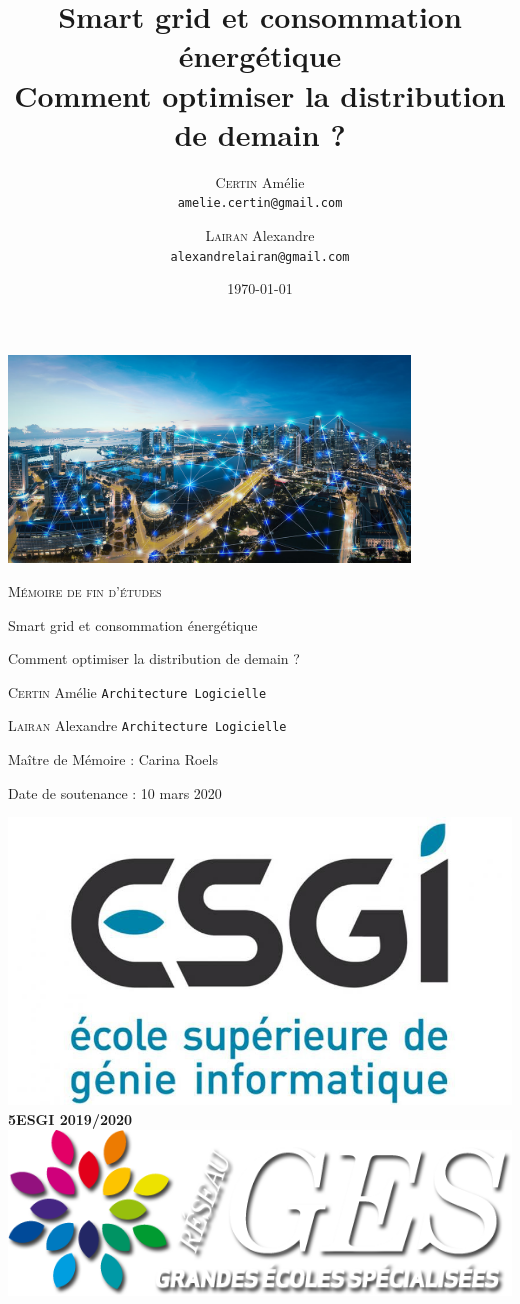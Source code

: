 \documentclass[12pt,french,a4paper,openany,twoside]{report}
\title{\textbf{Smart grid et consommation énergétique} \\ Comment optimiser la distribution de demain ?}
\author{
  \textsc{Certin} Amélie\\
  \texttt{amelie.certin@gmail.com}
  \and
  \textsc{Lairan} Alexandre\\
  \texttt{alexandrelairan@gmail.com}
}
\date{\today}
\begin{document}
  \begin{titlepage}
    \centering
    \vskip -10cm
    \includegraphics[width=0.8\textwidth]{media/header_main.jpg}\par\vspace{0.1cm}
    {\scshape\LARGE Mémoire de fin d’études \par}
    {\LARGE Smart grid et consommation énergétique \par}
    {\Large Comment optimiser la distribution de demain ? \par}

    \vfill

    \raggedright
    \textsc{Certin} Amélie
    \texttt{Architecture Logicielle}

    \textsc{Lairan} Alexandre
    \texttt{Architecture Logicielle}

    Maître de Mémoire : Carina Roels

    Date de soutenance : 10 mars 2020

    \vfill

    \begin{center}
      \includegraphics[scale=0.14]{media/esgi_logo.jpg}
      \LARGE \textbf{5ESGI 2019/2020}
      \includegraphics[scale=0.22]{media/logo_ges.png}
    \end{center}
  \end{titlepage}

  \maketitle
  \tableofcontents
  
  
  
\end{document}

